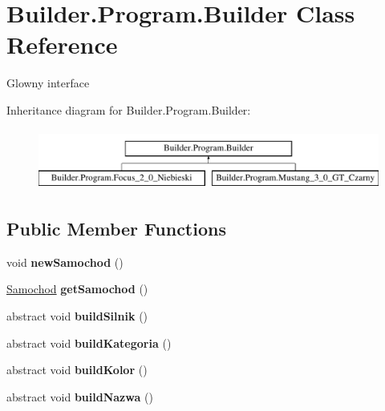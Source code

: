 \hypertarget{class_builder_1_1_program_1_1_builder}{}\section{Builder.\+Program.\+Builder Class Reference}
\label{class_builder_1_1_program_1_1_builder}


Glowny interface  


Inheritance diagram for Builder.\+Program.\+Builder\+:\begin{figure}[H]
\begin{center}
\leavevmode
\includegraphics[height=2.000000cm]{class_builder_1_1_program_1_1_builder}
\end{center}
\end{figure}
\subsection*{Public Member Functions}
\begin{DoxyCompactItemize}
\item 
\mbox{\label{class_builder_1_1_program_1_1_builder_a965509ae45286ca38694a876774a9c09}} 
void {\bfseries new\+Samochod} ()
\item 
\mbox{\label{class_builder_1_1_program_1_1_builder_a5ab500d83d0f5a82839b58548a16f457}} 
\hyperlink{class_builder_1_1_program_1_1_samochod}{Samochod} {\bfseries get\+Samochod} ()
\item 
\mbox{\label{class_builder_1_1_program_1_1_builder_a8193cb0bd469b75298af2a0b1bf654da}} 
abstract void {\bfseries build\+Silnik} ()
\item 
\mbox{\label{class_builder_1_1_program_1_1_builder_a40ad407267df66a335fc765f9ee62608}} 
abstract void {\bfseries build\+Kategoria} ()
\item 
\mbox{\label{class_builder_1_1_program_1_1_builder_a4116b74aa9e501068d7341c837631870}} 
abstract void {\bfseries build\+Kolor} ()
\item 
\mbox{\label{class_builder_1_1_program_1_1_builder_a9aad5c49ff78651d5e66139cf31d1c43}} 
abstract void {\bfseries build\+Nazwa} ()
\end{DoxyCompactItemize}
